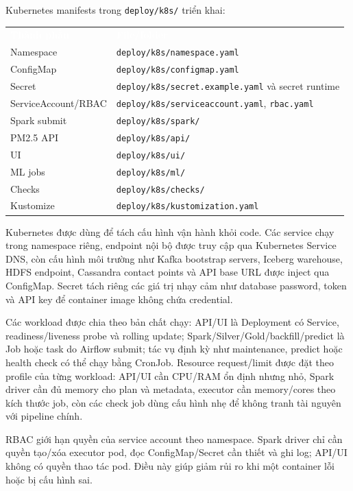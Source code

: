 \documentclass[12pt,a4paper]{article}
\begin{document}
Kubernetes manifests trong \texttt{deploy/k8s/} triển khai:

\begin{longtable}[]{@{}ll@{}}
\arrayrulecolor{HUSTBlue}\toprule\noalign{}
\rowcolor{HUSTBlue}
\textcolor{white}{\textbf{Thành phần}} & \textcolor{white}{\textbf{File/folder}} \\
\arrayrulecolor{HUSTBlue}\midrule\noalign{}
\endhead
\bottomrule\noalign{}
\endlastfoot
Namespace & \texttt{deploy/k8s/namespace.yaml} \\
ConfigMap & \texttt{deploy/k8s/configmap.yaml} \\
Secret & \texttt{deploy/k8s/secret.example.yaml} và secret runtime \\
ServiceAccount/RBAC & \texttt{deploy/k8s/serviceaccount.yaml}, \texttt{rbac.yaml} \\
Spark submit & \texttt{deploy/k8s/spark/} \\
PM2.5 API & \texttt{deploy/k8s/api/} \\
UI & \texttt{deploy/k8s/ui/} \\
ML jobs & \texttt{deploy/k8s/ml/} \\
Checks & \texttt{deploy/k8s/checks/} \\
Kustomize & \texttt{deploy/k8s/kustomization.yaml} \\
\end{longtable}

Kubernetes được dùng để tách cấu hình vận hành khỏi code. Các service chạy trong namespace riêng, endpoint nội bộ được truy cập qua Kubernetes Service DNS, còn cấu hình môi trường như Kafka bootstrap servers, Iceberg warehouse, HDFS endpoint, Cassandra contact points và API base URL được inject qua ConfigMap. Secret tách riêng các giá trị nhạy cảm như database password, token và API key để container image không chứa credential.

Các workload được chia theo bản chất chạy: API/UI là Deployment có Service, readiness/liveness probe và rolling update; Spark/Silver/Gold/backfill/predict là Job hoặc task do Airflow submit; tác vụ định kỳ như maintenance, predict hoặc health check có thể chạy bằng CronJob. Resource request/limit được đặt theo profile của từng workload: API/UI cần CPU/RAM ổn định nhưng nhỏ, Spark driver cần đủ memory cho plan và metadata, executor cần memory/cores theo kích thước job, còn các check job dùng cấu hình nhẹ để không tranh tài nguyên với pipeline chính.

RBAC giới hạn quyền của service account theo namespace. Spark driver chỉ cần quyền tạo/xóa executor pod, đọc ConfigMap/Secret cần thiết và ghi log; API/UI không có quyền thao tác pod. Điều này giúp giảm rủi ro khi một container lỗi hoặc bị cấu hình sai.
\end{document}
